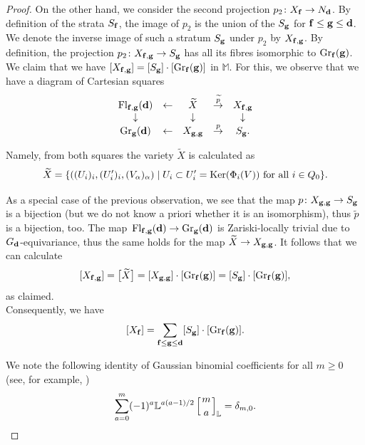 \documentclass[10pt,a4paper]{amsart}
\numberwithin{equation}{section}
\theoremstyle{definition}
\begin{document}
\begin{proof}
On the other hand, we consider the second projection $p_2\colon X_{\bf f}\rightarrow N_{\bf d}$. By definition of the strata $S_{\bf f}$, the image of $p_2$ is the union of the $S_{\bf g}$ for ${\bf f}\leq{\bf g}\leq{\bf d}$. We denote the inverse image of such a stratum $S_{\bf g}$ under $p_2$ by $X_{{\bf f},{\bf g}}$. By definition, the projection
$p_2\colon X_{{\bf f},{\bf g}}\rightarrow S_{\bf g}$
has all its fibres isomorphic to ${\rm Gr}_{\bf f}({\bf g})$. We claim that we have
$[X_{{\bf f},{\bf g}}]=[S_{\bf g}]\cdot[{\rm Gr}_{\bf f}({\bf g})]$
in $\mathbb{M}$. For this, we observe that we have a diagram of Cartesian squares
\[
\begin{array}{ccccc}{\rm Fl}_{{\bf f},{\bf g}}({\bf d})&\leftarrow&\widetilde{X}&\stackrel{\widetilde{p}}{\rightarrow}&X_{{\bf f},{\bf g}}\\\downarrow&&\downarrow&&\downarrow\\
{\rm Gr}_{\bf g}({\bf d})&\leftarrow&X_{{\bf g},{\bf g}}&\stackrel{p}{\rightarrow}&S_{\bf g}.\end{array}
\]

Namely, from both squares the variety $\widetilde{X}$ is calculated as
\[\widetilde{X}=\{((U_i)_i,(U_i')_i,(V_\alpha)_\alpha) \mid U_i\subset U_i'={\rm Ker}(\Phi_i(V))\mbox{ for all }i\in Q_0\}.\]

As a special case of the previous observation, we see that the map $p\colon X_{{\bf g},{\bf g}}\rightarrow S_{\bf g}$ is a bijection (but we do not know a priori whether it is an isomorphism), thus $\widetilde{p}$ is a bijection, too. The map~${{\rm Fl}_{{\bf f},{\bf g}}({\bf d})\rightarrow{\rm Gr}_{\bf g}({\bf d})}$ is Zariski-locally trivial due to $G_{\bf d}$-equivariance, thus the same holds for the map $\widetilde{X}\rightarrow X_{{\bf g},{\bf g}}$. It follows that we can calculate
\[[X_{{\bf f},{\bf g}}]=\big[\widetilde{X}\big]=[X_{{\bf g},{\bf g}}]\cdot[{\rm Gr}_{\bf f}({\bf g})]=[S_{\bf g}]\cdot[{\rm Gr}_{\bf f}({\bf g})],\]
as claimed.\\[1ex]
Consequently, we have
\[[X_{\bf f}]=\sum_{{\bf f}\leq{\bf g}\leq{\bf d}}[S_{\bf g}]\cdot[{\rm Gr}_{\bf f}({\bf g})].\]

We note the following identity of Gaussian binomial coefficients for all $m\geq 0$ (see, for example, \cite[equation~(3.14)]{RCounting})
\[\sum_{a=0}^m(-1)^a\mathbb{L}^{a(a-1)/2}\left[{m\atop a}\right]_\mathbb{L}=\delta_{m,0}.\]



\end{proof}
\end{document}
